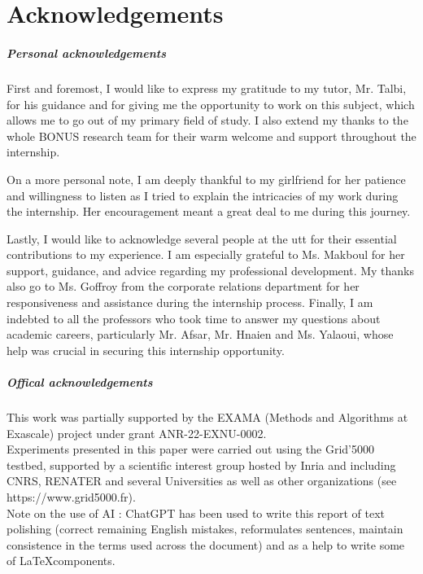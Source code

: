 \chapter*{Acknowledgements}

\paragraph{Personal acknowledgements}

First and foremost, I would like to express my gratitude to my tutor, Mr. Talbi, for his guidance and for giving me the opportunity to work on this subject, which allows me to go out of my primary field of study. I also extend my thanks to the whole BONUS research team for their warm welcome and support throughout the internship.  

On a more personal note, I am deeply thankful to my girlfriend for her patience and willingness to listen as I tried to explain the intricacies of my work during the internship. Her encouragement meant a great deal to me during this journey.  

Lastly, I would like to acknowledge several people at the \acrfull{utt} for their essential contributions to my experience. I am especially grateful to Ms. Makboul for her support, guidance, and advice regarding my professional development. My thanks also go to Ms. Goffroy from the corporate relations department for her responsiveness and assistance during the internship process. Finally, I am indebted to all the professors who took time to answer my questions about academic careers, particularly Mr. Afsar, Mr. Hnaien and Ms. Yalaoui, whose help was crucial in securing this internship opportunity.


\paragraph{Offical acknowledgements}
This work was partially supported by the EXAMA (Methods and Algorithms at Exascale) project under grant ANR-22-EXNU-0002.\\ 

Experiments presented in this paper were carried out using the Grid'5000 testbed, supported by a scientific interest group hosted by Inria and including CNRS, RENATER and several Universities as well as other organizations (see https://www.grid5000.fr).\\

Note on the use of AI : ChatGPT has been used to write this report of text polishing (correct remaining English mistakes, reformulates sentences, maintain consistence in the terms used across the document) and as a help to write some of \LaTeX components.